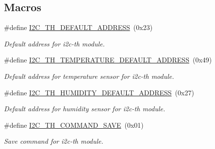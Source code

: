 \subsection*{Macros}
\begin{DoxyCompactItemize}
\item 
\mbox{\label{registers-th_8h_a66906eb81e92beab5f2076ac49996132}} 
\#define \hyperlink{registers-th_8h_a66906eb81e92beab5f2076ac49996132}{I2\+C\+\_\+\+T\+H\+\_\+\+D\+E\+F\+A\+U\+L\+T\+\_\+\+A\+D\+D\+R\+E\+SS}~(0x23)
\begin{DoxyCompactList}\small\item\em Default address for i2c-\/th module. \end{DoxyCompactList}\item 
\mbox{\label{registers-th_8h_a6d2d1a9b4ae7894be4b062205255f1ff}} 
\#define \hyperlink{registers-th_8h_a6d2d1a9b4ae7894be4b062205255f1ff}{I2\+C\+\_\+\+T\+H\+\_\+\+T\+E\+M\+P\+E\+R\+A\+T\+U\+R\+E\+\_\+\+D\+E\+F\+A\+U\+L\+T\+\_\+\+A\+D\+D\+R\+E\+SS}~(0x49)
\begin{DoxyCompactList}\small\item\em Default address for temperature sensor for i2c-\/th module. \end{DoxyCompactList}\item 
\mbox{\label{registers-th_8h_aa7b1a0982e4333dd39c7829eda6baa42}} 
\#define \hyperlink{registers-th_8h_aa7b1a0982e4333dd39c7829eda6baa42}{I2\+C\+\_\+\+T\+H\+\_\+\+H\+U\+M\+I\+D\+I\+T\+Y\+\_\+\+D\+E\+F\+A\+U\+L\+T\+\_\+\+A\+D\+D\+R\+E\+SS}~(0x27)
\begin{DoxyCompactList}\small\item\em Default address for humidity sensor for i2c-\/th module. \end{DoxyCompactList}\item 
\mbox{\label{registers-th_8h_afafbe31a0d6c332cd66e8a363b332daf}} 
\#define \hyperlink{registers-th_8h_afafbe31a0d6c332cd66e8a363b332daf}{I2\+C\+\_\+\+T\+H\+\_\+\+C\+O\+M\+M\+A\+N\+D\+\_\+\+S\+A\+VE}~(0x01)
\begin{DoxyCompactList}\small\item\em Save command for i2c-\/th module. \end{DoxyCompactList}\item 
\mbox{\label{registers-th_8h_a01ff8debbe24e2777d4669a05bba9aff}} 

\end{DoxyCompactItemize}
